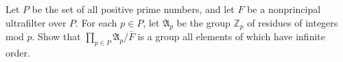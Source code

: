 Let $P$ be the set of all positive prime numbers, and let $F$ be a nonprincipal ultrafilter over $P$. For each $p \in P$, let $\mathfrak{A}_p$ be the group $\mathbb{Z}_p$ of residues of integers mod $p$. Show that $\prod_{p \in P} \mathfrak{A}_p / \bar{F}$ is a group all elements of which have infinite order.
